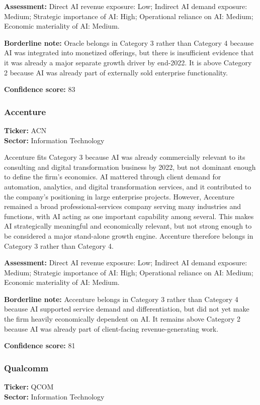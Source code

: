 \documentclass{article}
\begin{document}
\textbf{Assessment:} Direct AI revenue exposure: Low; Indirect AI demand exposure: Medium; Strategic importance of AI: High; Operational reliance on AI: Medium; Economic materiality of AI: Medium.

\textbf{Borderline note:} Oracle belongs in Category 3 rather than Category 4 because AI was integrated into monetized offerings, but there is insufficient evidence that it was already a major separate growth driver by end-2022. It is above Category 2 because AI was already part of externally sold enterprise functionality.

\textbf{Confidence score:} 83

\subsubsection*{Accenture}
\textbf{Ticker:} ACN \\
\textbf{Sector:} Information Technology

Accenture fits Category 3 because AI was already commercially relevant to its consulting and digital transformation business by 2022, but not dominant enough to define the firm’s economics. AI mattered through client demand for automation, analytics, and digital transformation services, and it contributed to the company’s positioning in large enterprise projects. However, Accenture remained a broad professional-services company serving many industries and functions, with AI acting as one important capability among several. This makes AI strategically meaningful and economically relevant, but not strong enough to be considered a major stand-alone growth engine. Accenture therefore belongs in Category 3 rather than Category 4.

\textbf{Assessment:} Direct AI revenue exposure: Low; Indirect AI demand exposure: Medium; Strategic importance of AI: High; Operational reliance on AI: Medium; Economic materiality of AI: Medium.

\textbf{Borderline note:} Accenture belongs in Category 3 rather than Category 4 because AI supported service demand and differentiation, but did not yet make the firm heavily economically dependent on AI. It remains above Category 2 because AI was already part of client-facing revenue-generating work.

\textbf{Confidence score:} 81

\subsubsection*{Qualcomm}
\textbf{Ticker:} QCOM \\
\textbf{Sector:} Information Technology
\end{document}
